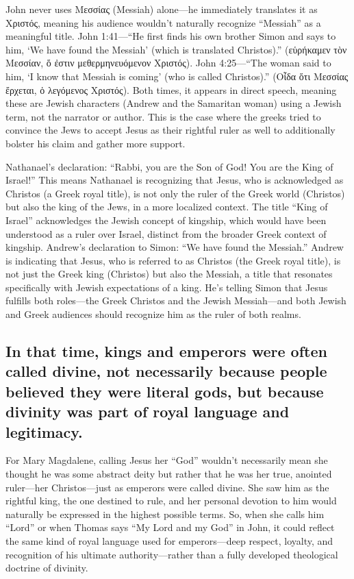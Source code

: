John never uses Μεσσίας (Messiah) alone---he immediately translates it as Χριστός, meaning his audience wouldn't naturally recognize ``Messiah'' as a meaningful title.
John 1:41---``He first finds his own brother Simon and says to him, `We have found the Messiah' (which is translated Christos).'' (εὑρήκαμεν τὸν Μεσσίαν, ὅ ἐστιν μεθερμηνευόμενον Χριστός).
John 4:25---``The woman said to him, `I know that Messiah is coming' (who is called Christos).'' (Οἶδα ὅτι Μεσσίας ἔρχεται, ὁ λεγόμενος Χριστός).
Both times, it appears in direct speech, meaning these are Jewish characters (Andrew and the Samaritan woman) using a Jewish term, not the narrator or author.
This is the case where the greeks tried to convince the Jews to accept Jesus as their rightful ruler as well to additionally bolster his claim and gather more support.

Nathanael's declaration: ``Rabbi, you are the Son of God!
You are the King of Israel!'' This means Nathanael is recognizing that Jesus, who is acknowledged as Christos (a Greek royal title), is not only the ruler of the Greek world (Christos) but also the king of the Jews, in a more localized context.
The title ``King of Israel'' acknowledges the Jewish concept of kingship, which would have been understood as a ruler over Israel, distinct from the broader Greek context of kingship.
Andrew's declaration to Simon: ``We have found the Messiah.'' Andrew is indicating that Jesus, who is referred to as Christos (the Greek royal title), is not just the Greek king (Christos) but also the Messiah, a title that resonates specifically with Jewish expectations of a king.
He's telling Simon that Jesus fulfills both roles---the Greek Christos and the Jewish Messiah---and both Jewish and Greek audiences should recognize him as the ruler of both realms.

\subsection{In that time, kings and emperors were often called divine, not necessarily because people believed they were literal gods, but because divinity was part of royal language and legitimacy.}\label{subsec:in-that-time-kings-and-emperors-were-often-called-divine-not-necessarily-because-people-believed-they-were-literal-gods-but-because-divinity-was-part-of-royal-language-and-legitimacy.}

For Mary Magdalene, calling Jesus her ``God'' wouldn't necessarily mean she thought he was some abstract deity but rather that he was her true, anointed ruler---her Christos---just as emperors were called divine.
She saw him as the rightful king, the one destined to rule, and her personal devotion to him would naturally be expressed in the highest possible terms.
So, when she calls him ``Lord'' or when Thomas says ``My Lord and my God'' in John, it could reflect the same kind of royal language used for emperors---deep respect, loyalty, and recognition of his ultimate authority---rather than a fully developed theological doctrine of divinity.

